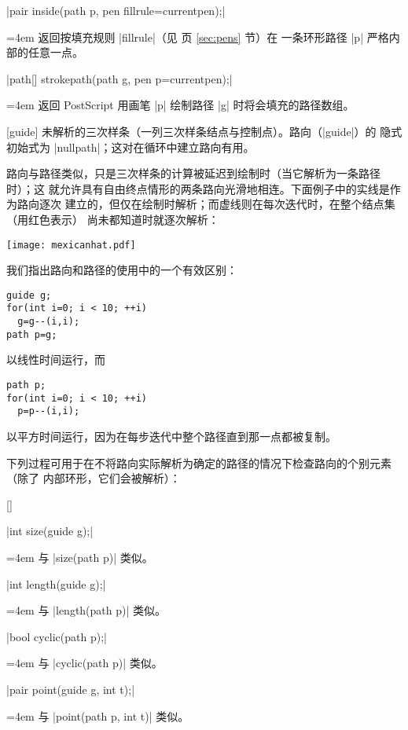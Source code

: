 \documentclass{ctexbook}
\makeatletter
\newenvironment{funclist}{\trivlist
  \parindent=0pt
\item[]
  \def\item{\medskip\par\leftskip=0pt}
  \def\go{\par\leftskip=4em}}
{\endtrivlist}
\newenvironment{typelist}{\itemize
  \let\old@item\@item
  \def\@item[##1]{\expandafter\old@item[\ttfamily\color{type!50!black}##1]}}
{\enditemize}
\newcommand*\prgname[1]{\textsf{#1}}
\makeatother
\begin{document}
\begin{typelist}
\begin{funclist}
\item |pair inside(path p, pen fillrule=currentpen);| \go
  返回按填充规则 |fillrule|（见 \pageref{sec:pens} 页 \ref{sec:pens} 节）在
  一条环形路径 |p| 严格内部的任意一点。

\item |path[] strokepath(path g, pen p=currentpen);| \go
  返回 \prgname{PostScript} 用画笔 |p| 绘制路径 |g| 时将会填充的路径数组。
\end{funclist}

\item[guide] 未解析的三次样条（一列三次样条结点与控制点）。路向（|guide|）的
隐式初始式为 |nullpath|；这对在循环中建立路向有用。

路向与路径类似，只是三次样条的计算被延迟到绘制时（当它解析为一条路径时）；这
就允许具有自由终点情形的两条路向光滑地相连。下面例子中的实线是作为路向逐次
建立的，但仅在绘制时解析；而虚线则在每次迭代时，在整个结点集（用红色表示）
尚未都知道时就逐次解析：

\begin{center}
  \texttt{[image: mexicanhat.pdf]}
\end{center}

我们指出路向和路径的使用中的一个有效区别：
\begin{lstlisting}
guide g;
for(int i=0; i < 10; ++i)
  g=g--(i,i);
path p=g;
\end{lstlisting}
以线性时间运行，而
\begin{lstlisting}
path p;
for(int i=0; i < 10; ++i)
  p=p--(i,i);
\end{lstlisting}
以平方时间运行，因为在每步迭代中整个路径直到那一点都被复制。

下列过程可用于在不将路向实际解析为确定的路径的情况下检查路向的个别元素（除了
内部环形，它们会被解析）：
\begin{funclist}
\item |int size(guide g);| \go
  与 |size(path p)| 类似。

\item |int length(guide g);| \go
  与 |length(path p)| 类似。

\item |bool cyclic(path p);| \go
  与 |cyclic(path p)| 类似。

\item |pair point(guide g, int t);| \go
  与 |point(path p, int t)| 类似。


\end{funclist}
\end{typelist}
\end{document}
